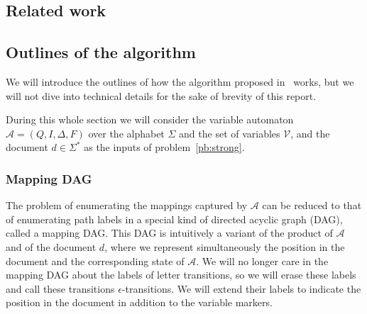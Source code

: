 \documentclass[12px]{article}
\theoremstyle{definition}
\begin{document}
    \subsection{Related work}


    \subsection{Outlines of the algorithm}

      We will introduce the outlines of how the algorithm proposed
      in~\cite{ICDT19} works, but we will not dive into technical details for
      the sake of brevity of this report.

      During this whole section we will consider the variable automaton
      $\mathcal{A} = (Q, I, \Delta, F)$ over the alphabet $\Sigma$ and the set
      of variables $\mathcal{V}$, and the document $d \in \Sigma^*$ as the
      inputs of problem~\ref{pb:strong}.

      \subsubsection{Mapping DAG}%
        \label{sec:mapping_dag}

        The problem of enumerating the mappings captured by $\mathcal{A}$ can
        be reduced to that of enumerating path labels in a special kind of
        directed acyclic graph (DAG), called a mapping DAG. This DAG is
        intuitively a variant of the product of $\mathcal{A}$ and of the
        document $d$, where we represent simultaneously the position in the
        document and the corresponding state of $\mathcal{A}$. We will no
        longer care in the mapping DAG about the labels of letter transitions,
        so we will erase these labels and call these transitions
        $\epsilon$-transitions.  We will extend their labels to indicate the
        position in the document in addition to the variable markers.
\end{document}

